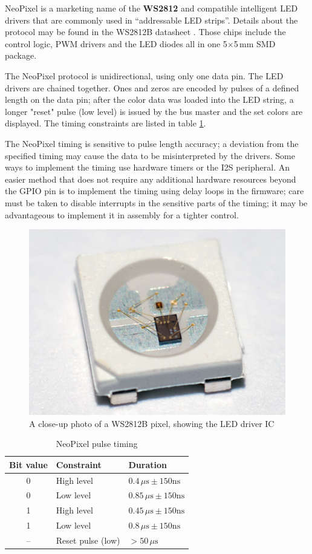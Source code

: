 NeoPixel is a marketing name of the \textbf{WS2812} and compatible intelligent \gls{LED} drivers that are commonly used in ``addressable \gls{LED} strips''. Details about the protocol may be found in the WS2812B datasheet \cite{neopixel-ds}. Those chips include the control logic, PWM drivers and the \gls{LED} diodes all in one 5$\times$5\,mm SMD package. 

The NeoPixel protocol is unidirectional, using only one data pin. The \gls{LED} drivers are chained together. Ones and zeros are encoded by pulses of a defined length on the data pin; after the color data was loaded into the \gls{LED} string, a longer "reset" pulse (low level) is issued by the bus master and the set colors are displayed. The timing constraints are listed in table \ref{fig:ws2812-dia}.

The NeoPixel timing is sensitive to pulse length accuracy; a deviation from the specified timing may cause the data to be misinterpreted by the drivers. Some ways to implement the timing use hardware timers or the \gls{I2S} peripheral. An easier method that does not require any additional hardware resources beyond the \gls{GPIO} pin is to implement the timing using delay loops in the firmware; care must be taken to disable interrupts in the sensitive parts of the timing; it may be advantageous to implement it in assembly for a tighter control.

\begin{figure}[h]
	\centering
	\includegraphics[width=.5\textwidth] {img/ws2812b-detail.jpg}
	\caption{\label{fig:ws2812-detail}A close-up photo of a WS2812B pixel, showing the LED driver IC}
\end{figure}

\begin{table}[h]
	\centering
	\begin{tabular}{cll}
		\toprule
		\textbf{Bit value} & \textbf{Constraint} & \textbf{Duration} \\
		\midrule
		0 & High level & $0.4\,\mu\mathrm{s}\pm150\mathrm{ns}$ \\
		0 & Low level & $0.85\,\mu\mathrm{s}\pm150\mathrm{ns}$ \\
		1 & High level & $0.45\,\mu\mathrm{s}\pm150\mathrm{ns}$ \\
		1 & Low level & $0.8\,\mu\mathrm{s}\pm150\mathrm{ns}$ \\
		-- & Reset pulse (low) & $>50\,\mu\mathrm{s}$ \\
		\bottomrule
	\end{tabular}
	\caption{\label{fig:ws2812-dia}NeoPixel pulse timing}
\end{table}




